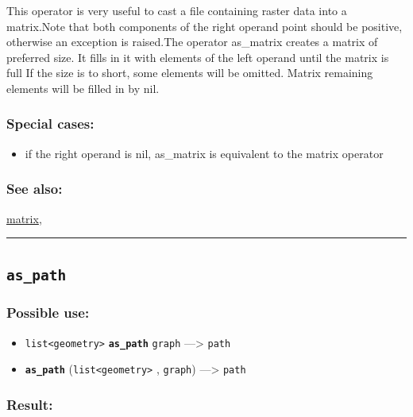 \documentclass[]{book}
\providecommand{\tightlist}{%
  \setlength{\itemsep}{0pt}\setlength{\parskip}{0pt}}
\theoremstyle{definition}
\theoremstyle{definition}
\theoremstyle{definition}
\theoremstyle{remark}
\begin{document}
This operator is very useful to cast a file containing raster data into
a matrix.Note that both components of the right operand point should be
positive, otherwise an exception is raised.The operator as\_matrix
creates a matrix of preferred size. It fills in it with elements of the
left operand until the matrix is full If the size is to short, some
elements will be omitted. Matrix remaining elements will be filled in by
nil.

\subsubsection{Special cases:}\label{special-cases-21}

\begin{itemize}
\tightlist
\item
  if the right operand is nil, as\_matrix is equivalent to the matrix
  operator
\end{itemize}

\subsubsection{See also:}\label{see-also-37}

\href{operators-i-to-m.html\#matrix}{matrix},

\begin{center}\rule{0.5\linewidth}{\linethickness}\end{center}

\subsection{\texorpdfstring{\texttt{as\_path}}{as\_path}}\label{as_path}

\subsubsection{Possible use:}\label{possible-use-54}

\begin{itemize}
\tightlist
\item
  \texttt{list\textless{}geometry\textgreater{}}
  \textbf{\texttt{as\_path}} \texttt{graph} ---\textgreater{}
  \texttt{path}
\item
  \textbf{\texttt{as\_path}}
  (\texttt{list\textless{}geometry\textgreater{}} , \texttt{graph})
  ---\textgreater{} \texttt{path}
\end{itemize}

\subsubsection{Result:}\label{result-53}
\end{document}

